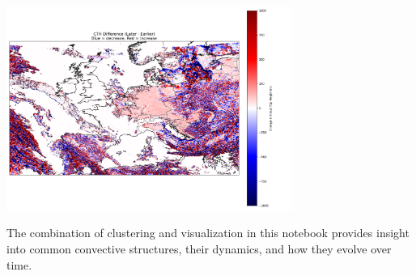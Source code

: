 \begin{enumerate}[label=\textbf{Step \arabic*:}, leftmargin=2cm]
\begin{center}
    \includegraphics[width=0.7\textwidth]{images/cth_difference_map.png}
\end{center}

\end{enumerate}

The combination of clustering and visualization in this notebook provides insight into common convective structures, their dynamics, and how they evolve over time.


